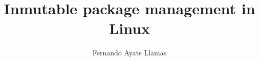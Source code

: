 \documentclass[a4paper,twoside]{report}
\title{Inmutable package management in Linux}
\author{Fernando Ayats Llamas}
\begin{document}
\begin{abstract}
  
\end{abstract}
\newpage

\renewcommand{\abstractname}{Acknowledgements}
\begin{abstract}
  
\end{abstract}
\newpage


\begin{titlepage}
  \tableofcontents
  \listoffigures
  \listoftables
\end{titlepage}









\end{document}
